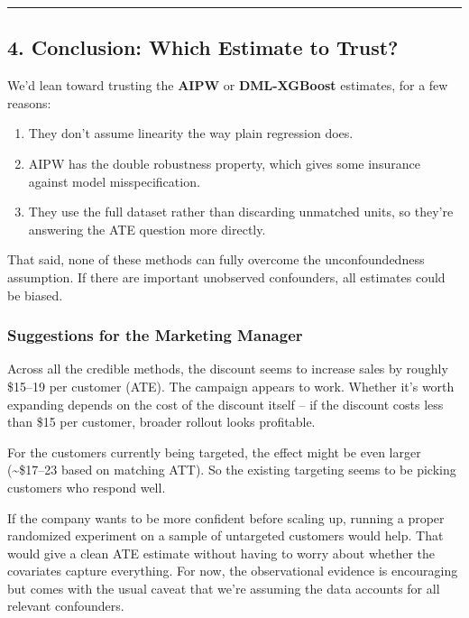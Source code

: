 \documentclass[
  letterpaper,
  DIV=11,
  numbers=noendperiod]{scrartcl}
\providecommand{\tightlist}{%
  \setlength{\itemsep}{0pt}\setlength{\parskip}{0pt}}
\begin{document}
\begin{center}\rule{0.5\linewidth}{0.5pt}\end{center}

\subsection{4. Conclusion: Which Estimate to
Trust?}\label{conclusion-which-estimate-to-trust}

We'd lean toward trusting the \textbf{AIPW} or \textbf{DML-XGBoost}
estimates, for a few reasons:

\begin{enumerate}
\def\labelenumi{\arabic{enumi}.}
\tightlist
\item
  They don't assume linearity the way plain regression does.
\item
  AIPW has the double robustness property, which gives some insurance
  against model misspecification.
\item
  They use the full dataset rather than discarding unmatched units, so
  they're answering the ATE question more directly.
\end{enumerate}

That said, none of these methods can fully overcome the unconfoundedness
assumption. If there are important unobserved confounders, all estimates
could be biased.

\subsubsection{Suggestions for the Marketing
Manager}\label{suggestions-for-the-marketing-manager}

Across all the credible methods, the discount seems to increase sales by
roughly \$15--19 per customer (ATE). The campaign appears to work.
Whether it's worth expanding depends on the cost of the discount itself
-- if the discount costs less than \$15 per customer, broader rollout
looks profitable.

For the customers currently being targeted, the effect might be even
larger (\textasciitilde\$17--23 based on matching ATT). So the existing
targeting seems to be picking customers who respond well.

If the company wants to be more confident before scaling up, running a
proper randomized experiment on a sample of untargeted customers would
help. That would give a clean ATE estimate without having to worry about
whether the covariates capture everything. For now, the observational
evidence is encouraging but comes with the usual caveat that we're
assuming the data accounts for all relevant confounders.
\end{document}
